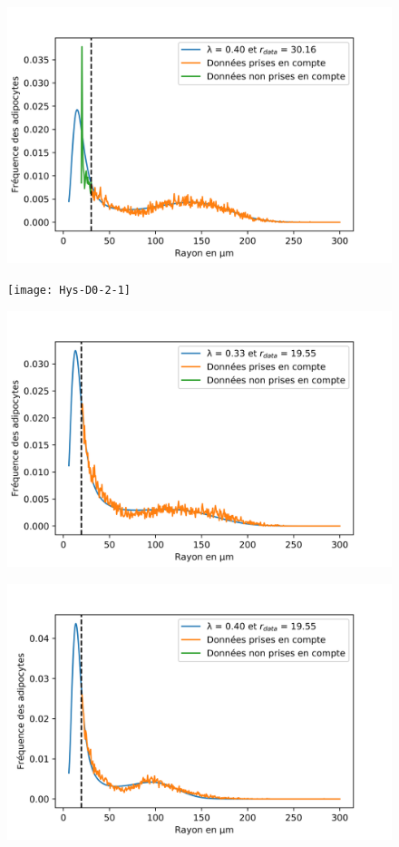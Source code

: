 \documentclass[a4paper,fleqn,leqno]{article}
\begin{document}
\begin{figure}[H]
\centering
\includegraphics[scale=0.9]{Hys-D0-1-1}
\end{figure}

\begin{figure}[H]
\centering
\texttt{[image: Hys-D0-2-1]}
\end{figure}

\begin{figure}[H]
\centering
\includegraphics[scale=0.9]{Hys-D0-3-1}
\end{figure}

\begin{figure}[H]
\centering
\includegraphics[scale=0.9]{Hys-D0-4-1}
\end{figure}
\end{document}
